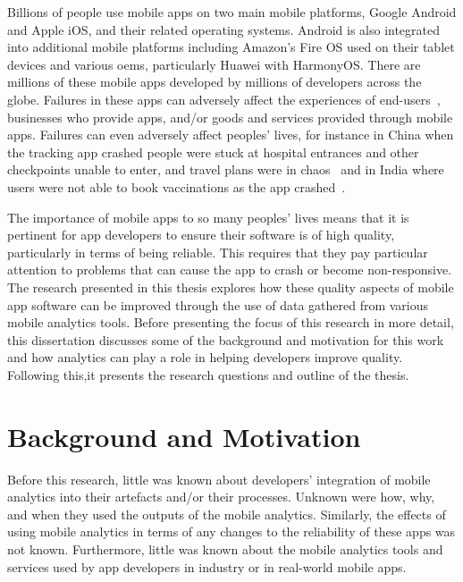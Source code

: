 

Billions of people use mobile apps on two main mobile platforms, Google Android and Apple iOS, and their related operating systems.  Android is also integrated into additional mobile platforms including Amazon's Fire OS used on their tablet devices and various \glspl{oem}, particularly Huawei with HarmonyOS. There are millions of these mobile apps developed by millions of developers across the globe. Failures in these apps can adversely affect the experiences of end-users~, businesses who provide apps, and/or goods and services provided through mobile apps. Failures can even adversely affect peoples' lives, for instance in China when the  tracking app crashed people were stuck at hospital entrances and other checkpoints unable to enter, and travel plans were in chaos~ and in India where users were not able to book vaccinations as the app crashed~.

The importance of mobile apps to so many peoples' lives means that it is pertinent for app developers to ensure their software is of high quality, particularly in terms of being reliable. This requires that they pay particular attention to problems that can cause the app to crash or become non-responsive. The research presented in this thesis explores how these quality aspects of mobile app software can be improved through the use of data gathered from various mobile analytics tools. Before presenting the focus of this research in more detail, this dissertation discusses some of the background and motivation for this work and how analytics can play a role in helping developers improve quality. Following this,it presents the research questions and outline of the thesis.

\section{Background and Motivation}
Before this research, little was known about developers' integration of mobile analytics into their artefacts and/or their processes. Unknown were how, why, and when they used the outputs of the mobile analytics. Similarly, the effects of using mobile analytics in terms of any changes to the reliability of these apps was not known. Furthermore, little was known about the mobile analytics tools and services used by app developers in industry or in real-world mobile apps.

